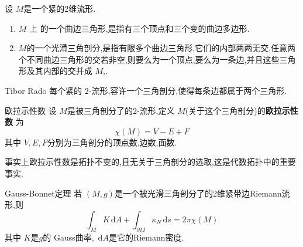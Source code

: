 \documentclass[../../main.tex]{subfiles}
\begin{document}
\begin{definition}
    设 \(  M  \)是一个紧的2维流形.
    \begin{enumerate}
        \item  \textbf{\(  M  \) }上 的一个曲边三角形,是指有三个顶点和三个变的曲边多边形.
        \item \(  M  \)的一个光滑三角剖分,是指有限多个曲边三角形,它们的内部两两无交,任意两个不同曲边三角形的交若非空,则要么为一个顶点,要么为一条边,并且这些三角形及其内部的交并成  \(  M  \),. 
    \end{enumerate}
     
\end{definition}

\begin{theorem}{Tibor Rado}
    每个紧的 \(  2  \)-流形,容许一个三角剖分,使得每条边都属于两个三角形. 
\end{theorem}


\begin{definition}{欧拉示性数}
    设 \(  M  \)是被三角剖分了的2-流形,定义 \(  M  \)(关于这个三角剖分)的\textbf{欧拉示性数}  为 \[
    \chi \left( M \right)= V-E+ F 
    \]其中 \(  V,E,F  \)分别为三角剖分的顶点数,边数,面数. 
\end{definition}

\begin{remark}
    事实上欧拉示性数是拓扑不变的,且无关于三角剖分的选取,这是代数拓扑中的重要事实.
\end{remark}

\begin{theorem}{Gauss-Bonnet定理}
    若 \(  \left( M,g \right)   \)是一个被光滑三角剖分了的2维紧带边Riemann流形,则 \[
    \int_{M}K\,\mathrm{d} A+ \int_{ \partial M} \kappa _{N}\,\mathrm{d} s= 2\pi \chi \left( M \right) 
    \]其中 \(  K  \)是\(  g  \)的 Gauss曲率, \(  \,\mathrm{d} A  \)是它的Riemann密度.  
\end{theorem}
\end{document}
